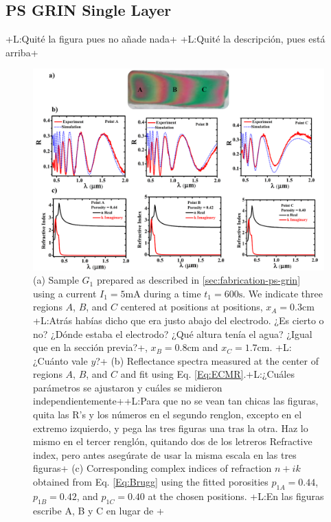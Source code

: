 \documentclass{article}
\newcommand{\notaL}[1]{{\color{blue}+L:#1+}}
\begin{document}
\subsection{PS GRIN Single Layer }
\label{sec:ps-grin-single}
\notaL{Quité la figura pues no añade nada}
\notaL{Quité la descripción, pues está arriba}
\begin{figure}
  \centering
  \includegraphics[width=\textwidth]{Images/SPgrin51}
  \caption{(a)  Sample $G_1$ prepared as described in
     \ref{sec:fabrication-ps-grin} using a current $I_1=5 \text{mA}$
    during a time $t_1=600\text{s}$. We indicate three regions $A$,
    $B$, and $C$ centered at positions at positions,
    $x_A=0.3\text{cm}$ \notaL{Atrás habías dicho que era justo abajo
      del electrodo. ¿Es cierto o no? ¿Dónde estaba el electrodo? ¿Qué
    altura tenía el agua? ¿Igual que en la sección previa?}, $x_B=0.8\text{cm}$ and
    $x_C=1.7\text{cm}$. \notaL{¿Cuánto vale $y$?} (b) Reflectance
    spectra measured at the center of regions $A$, $B$, and $C$ and fit
    using Eq. \eqref{Eq:ECMR}.\notaL{¿Cuáles parámetros se ajustaron y
      cuáles se midieron independientemente}\notaL{Para que no se vean
      tan chicas las figuras, quita las R's y los números en el segundo
      renglon, excepto en el extremo izquierdo, y pega las tres
      figuras una tras la otra. Haz lo mismo en el tercer renglón,
      quitando dos de los letreros Refractive index, pero antes
      asegúrate de usar la misma escala en las tres figuras} (c)
    Corresponding complex indices of refraction $n+ik$ obtained from
    Eq. \eqref{Eq:Brugg} using the fitted porosities $p_{1A}=0.44$,
    $p_{1B}=0.42$, and $p_{1C}= 0.40$ at the chosen positions. \notaL{En las
      figuras escribe A, B y C en lugar de
}}
\end{figure}
\end{document}
